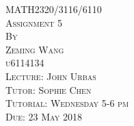 \documentclass[11pt,a4paper]{amsart}
\begin{document}
\thispagestyle{empty}
\begin{center}
\huge
\vspace*{1.0in} MATH2320/3116/6110
\\\vspace{0.5in} \textsc{Assignment 5}
\normalsize
\\\vspace{0.5in} \textsc{By}
\\\vspace{0.1in} \textsc{Zeming Wang}
\\\vspace{0.1in} \textsc{u6114134}
\normalsize
\\\vspace{0.5in} \textsc{Lecture: John Urbas}
\\\vspace{0.1in} \textsc{Tutor: Sophie Chen}
\\\vspace{0.1in} \textsc{Tutorial: Wednesday 5-6 pm}
\normalsize
\\\vspace{0.5in} \textsc{Due: 23 May 2018}
\end{center}

\newpage
\setcounter{page}{1}
















\end{document}
